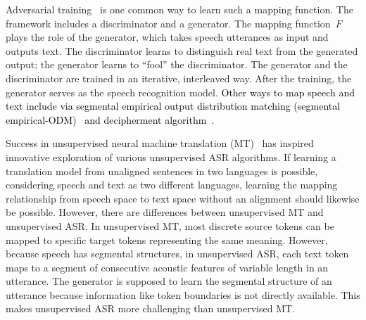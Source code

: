 Adversarial training~\cite{goodfellow2014generative,arjovsky2017wasserstein, gulrajani2017improved} is one common way to learn such a 
mapping function. 
The framework includes a discriminator and a generator.
The mapping function~$F$ plays the role of the generator, which takes speech utterances as input and outputs text.
The discriminator learns to distinguish real text from the generated
output; the generator learns to ``fool'' the discriminator.
The generator and the discriminator are trained in an iterative, 
interleaved way. 
After the training, the generator serves as the speech recognition model.
\textcolor{black}{
Other ways to map speech and text include via segmental empirical output distribution matching (segmental empirical-ODM)~\cite{yeh2018unsupervised} and decipherment algorithm~\cite{Deciphering2022}.}

Success in unsupervised neural machine translation
(MT)~\cite{artetxe2017unsupervised, conneau2017word, lample2017unsupervised}
has inspired innovative exploration of various unsupervised ASR algorithms.
If learning a translation model from unaligned sentences in two languages is
possible, considering speech and text as two different languages, learning the
mapping relationship from speech space to text space without an alignment 
  should likewise be possible.   %
However, there are differences between unsupervised MT and unsupervised
ASR.
In unsupervised MT, most discrete source tokens can be mapped to specific
target tokens representing the same meaning. 
However, because speech has segmental structures, in unsupervised ASR, each text
token maps to a segment of consecutive acoustic features of variable length in
an utterance.
The generator is supposed to learn the segmental structure of an utterance
because information like token boundaries is not directly available.
This makes unsupervised ASR more challenging than unsupervised MT.


